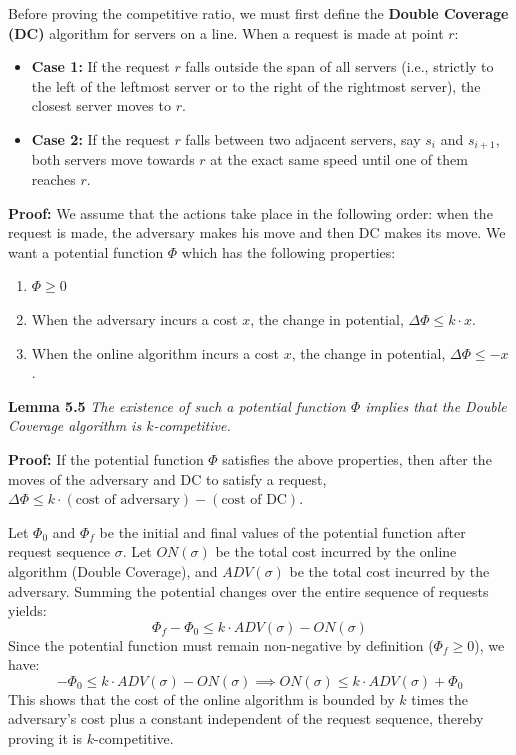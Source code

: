 \documentclass[14pt]{extreport}
\begin{document}
\vspace{5mm}
Before proving the competitive ratio, we must first define the \textbf{Double Coverage (DC)} algorithm for servers on a line. When a request is made at point $r$:
\begin{itemize}
    \item \textbf{Case 1:} If the request $r$ falls outside the span of all servers (i.e., strictly to the left of the leftmost server or to the right of the rightmost server), the closest server moves to $r$.
    \item \textbf{Case 2:} If the request $r$ falls between two adjacent servers, say $s_i$ and $s_{i+1}$, both servers move towards $r$ at the exact same speed until one of them reaches $r$. 
\end{itemize}

\textbf{Proof:} We assume that the actions take place in the following order: when the request is made, the adversary makes his move and then DC makes its move. We want a potential function $\Phi$ which has the following properties:

\begin{enumerate}
    \item $\Phi \geq 0$
    \item When the adversary incurs a cost $x$, the change in potential, $\Delta\Phi \leq k \cdot x$.
    \item When the online algorithm incurs a cost $x$, the change in potential, $\Delta\Phi \leq -x$.
\end{enumerate}

\textbf{Lemma 5.5} \textit{The existence of such a potential function $\Phi$ implies that the Double Coverage algorithm is $k$-competitive.}

\vspace{5mm}
\textbf{Proof:} If the potential function $\Phi$ satisfies the above properties, then after the moves of the adversary and DC to satisfy a request, $\Delta\Phi \leq k \cdot (\text{cost of adversary}) - (\text{cost of DC})$. 

\vspace{5mm}
Let $\Phi_0$ and $\Phi_f$ be the initial and final values of the potential function after request sequence $\sigma$. Let $ON(\sigma)$ be the total cost incurred by the online algorithm (Double Coverage), and $ADV(\sigma)$ be the total cost incurred by the adversary. Summing the potential changes over the entire sequence of requests yields:
\[ \Phi_f - \Phi_0 \leq k \cdot ADV(\sigma) - ON(\sigma) \]
Since the potential function must remain non-negative by definition ($\Phi_f \geq 0$), we have:
\[ - \Phi_0 \leq k \cdot ADV(\sigma) - ON(\sigma) \implies ON(\sigma) \leq k \cdot ADV(\sigma) + \Phi_0 \]
This shows that the cost of the online algorithm is bounded by $k$ times the adversary's cost plus a constant independent of the request sequence, thereby proving it is $k$-competitive.
\end{document}
